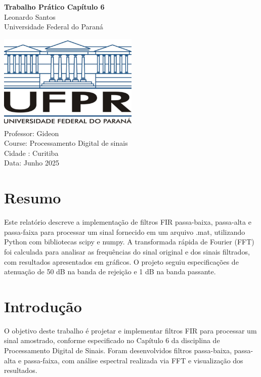 \documentclass[a4paper,12pt]{article}
\begin{document}
\begin{titlepage}
    \centering
    \vspace*{2cm}
    \Huge
    \textbf{Trabalho Prático Capítulo 6} \\
    \vspace{1cm}
    \Large
    Leonardo Santos \\
    Universidade Federal do Paraná \\
    \vspace{0.5cm}
    \normalsize
   
    \vspace{2cm}
    \includegraphics[width=0.5\textwidth]{ufpr.png} \\
    \vspace{1cm}
    \large
    Professor: Gideon \\
    Course: Processamento Digital de sinais \\
    Cidade : Curitiba \\
    Data: Junho 2025 \\
\end{titlepage}

\section*{Resumo}
Este relatório descreve a implementação de filtros FIR passa-baixa, passa-alta e passa-faixa para processar um sinal fornecido em um arquivo .mat, utilizando Python com bibliotecas scipy e numpy. A transformada rápida de Fourier (FFT) foi calculada para analisar as frequências do sinal original e dos sinais filtrados, com resultados apresentados em gráficos. O projeto seguiu especificações de atenuação de 50 dB na banda de rejeição e 1 dB na banda passante.

\section{Introdução}
O objetivo deste trabalho é projetar e implementar filtros FIR para processar um sinal amostrado, conforme especificado no Capítulo 6 da disciplina de Processamento Digital de Sinais. Foram desenvolvidos filtros passa-baixa, passa-alta e passa-faixa, com análise espectral realizada via FFT e visualização dos resultados.
\end{document}
